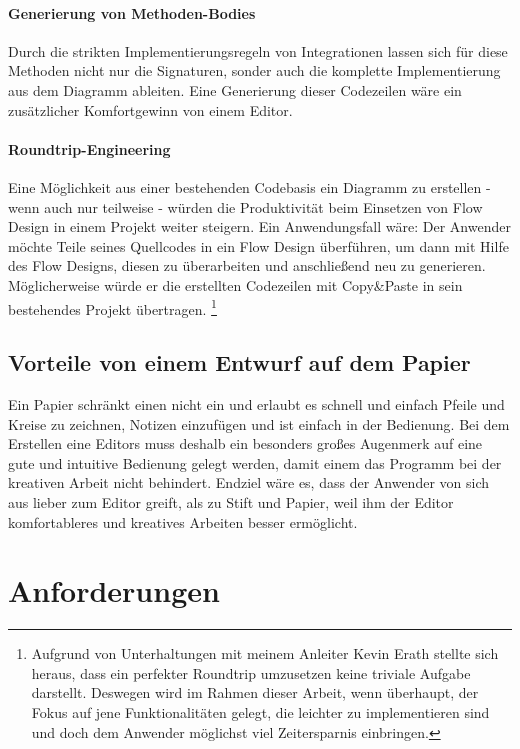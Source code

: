 \subsubsection{Generierung von Methoden-Bodies}

Durch die strikten Implementierungsregeln von Integrationen lassen sich für
diese Methoden nicht nur die Signaturen, sonder auch die komplette Implementierung aus dem Diagramm
ableiten. Eine Generierung dieser Codezeilen wäre ein zusätzlicher Komfortgewinn von einem Editor.
\subsubsection{Roundtrip-Engineering}

Eine Möglichkeit aus einer bestehenden Codebasis ein Diagramm zu erstellen -
wenn auch nur teilweise - würden die Produktivität beim Einsetzen von Flow
Design in einem Projekt weiter steigern.
Ein Anwendungsfall wäre: Der Anwender möchte
Teile seines Quellcodes in ein Flow Design überführen, um dann mit Hilfe des
Flow Designs, diesen zu überarbeiten und anschließend neu zu generieren.
Möglicherweise würde er die erstellten Codezeilen mit Copy\&Paste in sein
bestehendes Projekt übertragen.
\footnote{Aufgrund von Unterhaltungen mit meinem
Anleiter Kevin Erath stellte sich heraus, dass ein perfekter Roundtrip umzusetzen keine triviale Aufgabe
darstellt. Deswegen wird im Rahmen dieser Arbeit, wenn überhaupt, der Fokus auf jene Funktionalitäten
gelegt, die leichter zu implementieren sind und doch dem Anwender möglichst viel
Zeitersparnis einbringen.}

\section{Vorteile von einem Entwurf auf dem Papier}

Ein Papier schränkt einen nicht ein und erlaubt es schnell und einfach Pfeile
und Kreise zu zeichnen, Notizen einzufügen und ist einfach in der Bedienung.
Bei dem Erstellen eine Editors muss deshalb ein besonders großes Augenmerk auf
eine gute und intuitive Bedienung gelegt werden, damit einem das Programm bei der kreativen Arbeit nicht
behindert. Endziel wäre es, dass der Anwender von sich aus lieber zum Editor
greift, als zu Stift und Papier, weil ihm der Editor komfortableres und
kreatives Arbeiten besser ermöglicht.

\chapter{Anforderungen}

